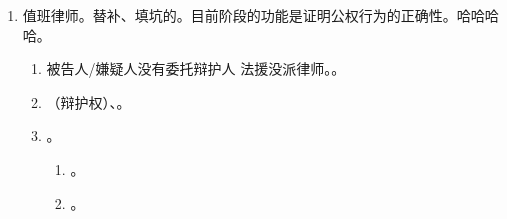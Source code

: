 \begin{enumerate}
\begin{enumerate}
\begin{enumerate}
\begin{enumerate}
                          \item 强制。 \yjt {}法援机构。
                                \begin{itemize}
                                  \item 强制 = 从头到尾都要有。。
                                  \item 其他情形提到法援，都不构成。
                                        。
                                  \item 委派律师作为辩护人（嫌疑人/被告人）还是诉讼代理人分情况。。
                                \end{itemize}
                          \item 裁量。
                        \end{enumerate}
                  \item {}。相同 \yjt 保障嫌疑人、被告人的辩护权。不同。
                        \begin{enumerate}
                          \item {}不同。口诀。
                          \item {}不同。法院、公安、检有义务；当事人自己。
                          \item {}不同。补充性、替补性。委托辩护 \dy 法援辩护。不应指派 \hz 终止援助。
                        \end{enumerate}
                \end{enumerate}
          \item 值班律师。替补、填坑的。目前阶段的功能是证明公权行为的正确性。哈哈哈哈。
                \begin{enumerate}
                  \item 被告人/嫌疑人没有委托辩护人 \hz 法援没派律师。。
                  \item {}（\bdy 辩护权）、。
                  \item {}。
                        \begin{enumerate}
                          \item {}。
                          \item {}。

\end{enumerate}
\end{enumerate}
\end{enumerate}
\end{enumerate}
